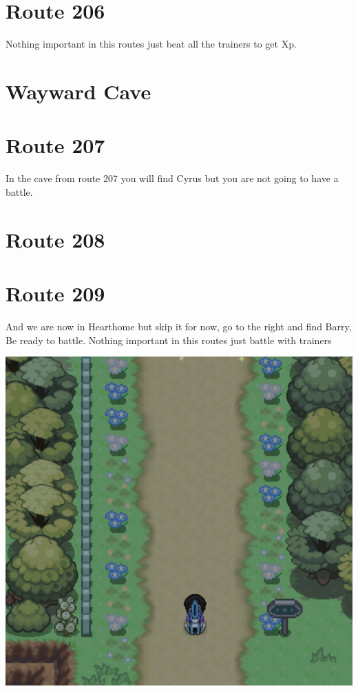 \documentclass[11pt]{article}
\begin{document}
\section{Route 206}\label{sec:Route_206}

Nothing important in this routes just beat all the trainers to get Xp.



\section{Wayward Cave}
\label{sec:Wayward_Cave}


\section{Route 207}\label{sec:Route_207}

In the cave from route 207 you will find Cyrus but you are not going to have a battle.



\section{Route 208}\label{sec:Route_208}


\section{Route 209}\label{sec:Route_209}
And we are now in Hearthome but skip it for now, go to the right and find Barry, Be ready to battle.
Nothing important in this routes just battle with trainers

\includegraphics[width=\textwidth]{walkthrough/Sinnoh/Route_209}
\end{document}
